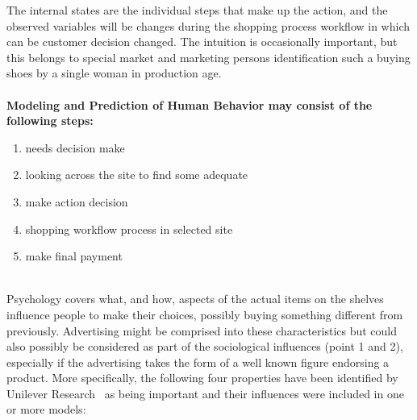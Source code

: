 The internal states are the individual steps that make up the action, and the observed variables will be changes during the shopping process
workflow in which can be customer decision changed.
The intuition is occasionally important, but this belongs to special market and marketing persons identification such
a buying shoes by a single woman in production age.\\
\\
\textbf{Modeling and Prediction of Human Behavior may consist of the following steps:}\\
\begin{enumerate}
	\item needs decision make
	\item looking across the site to find some adequate
	\item make action decision
	\item shopping workflow process in selected site
	\item make final payment
\end{enumerate}
\\
Psychology covers what, and how, aspects of the actual items on the shelves influence people to make their choices,
possibly buying something different from previously.
Advertising might be comprised into these characteristics but could also possibly be considered as part of the sociological
influences (point 1 and 2), especially if the advertising takes the form of a well known figure endorsing a product.
More specifically, the following four properties have been identified by Unilever Research~\cite{patel} as being important
and their influences were included in one or more models:

